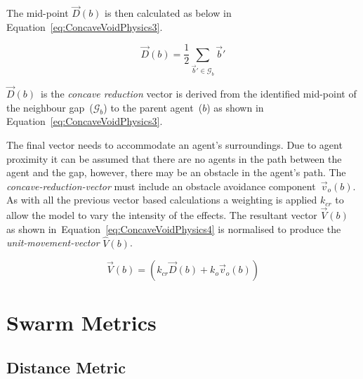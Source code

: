\documentclass{ieeeaccess}
\begin{document}


The mid-point $\vec D(b)$ is then calculated as below in Equation~\ref{eq:ConcaveVoidPhysics3}.

\begin{equation}
\label{eq:ConcaveVoidPhysics3}
\vec D(b) = \frac{1}{2}\sum_{\vec b' \in \mathcal G_b}\vec b' 
\end{equation}

$\vec D(b)$~is the \textit{concave reduction} vector is derived from the identified
mid-point of the neighbour gap~($\mathcal{G}_b$) to the parent agent~($b$) as
shown in Equation~\ref{eq:ConcaveVoidPhysics3}.


The final vector needs to accommodate an agent's surroundings. Due to agent
proximity it can be assumed that there are no agents in the path between the
agent and the gap, however, there may be an obstacle in the agent's path. The
\textit{concave-reduction-vector} must include an obstacle avoidance
component~$\vec v_o(b)$.  As with all the previous vector based calculations a 
weighting is applied $k_{cr}$ to allow the model to vary the intensity of the effects.  
The resultant vector $\vec V(b)$ as shown
in~Equation~\ref{eq:ConcaveVoidPhysics4}  is normalised to produce the \textit{unit-movement-vector}
$\hat V(b)$.

\begin{equation}\label{eq:ConcaveVoidPhysics4}
\vec V(b) = (k_{cr}\vec D(b) + k_o\vec v_o(b))
\end{equation}

\section{Swarm Metrics}

\subsection{Distance Metric}
\end{document}
